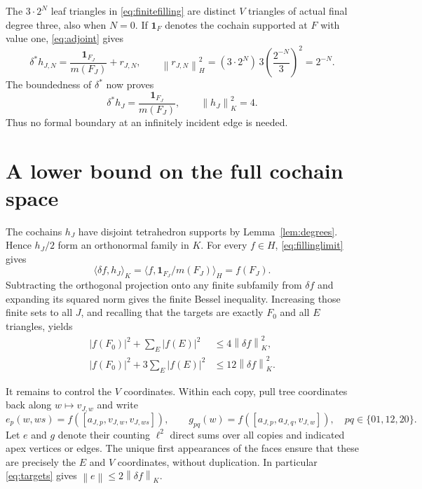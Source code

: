 \documentclass[11pt]{article}
\newcommand{\norm}[1]{\left\lVert#1\right\rVert}
\newcommand{\ip}[2]{\langle#1,#2\rangle}
\begin{document}
The $3\cdot2^N$ leaf triangles in \eqref{eq:finitefilling} are distinct $V$
triangles of actual final degree three, also when $N=0$. If $\mathbf1_F$
denotes the cochain supported at $F$ with value one, \eqref{eq:adjoint} gives
\[
 \delta^*h_{J,N}=\frac{\mathbf1_{F_J}}{m(F_J)}+r_{J,N},
 \qquad
 \norm{r_{J,N}}_H^2
   =(3\cdot2^N)\,3\left(\frac{2^{-N}}3\right)^2=2^{-N}.
\]
The boundedness of $\delta^*$ now proves
\begin{equation}\label{eq:fillinglimit}
 \delta^*h_J=\frac{\mathbf1_{F_J}}{m(F_J)},\qquad
 \norm{h_J}_K^2=4.
\end{equation}
Thus no formal boundary at an infinitely incident edge is needed.

\section{A lower bound on the full cochain space}\label{sec:estimate}

The cochains $h_J$ have disjoint tetrahedron supports by
Lemma~\ref{lem:degrees}. Hence $h_J/2$ form an orthonormal family in $K$.
For every $f\in H$, \eqref{eq:fillinglimit} gives
\[
 \ip{\delta f}{h_J}_K
   =\ip{f}{\mathbf1_{F_J}/m(F_J)}_H=f(F_J).
\]
Subtracting the orthogonal projection onto any finite subfamily from
$\delta f$ and expanding its squared norm gives the finite Bessel inequality.
Increasing those finite sets to all $J$, and recalling that the targets are
exactly $F_0$ and all $E$ triangles, yields
\begin{align}
 |f(F_0)|^2+\sum_E|f(E)|^2&\leq4\norm{\delta f}_K^2,
       \label{eq:targets}\\
 |f(F_0)|^2+3\sum_E|f(E)|^2&\leq12\norm{\delta f}_K^2.
       \label{eq:weightedtargets}
\end{align}

It remains to control the $V$ coordinates. Within each copy, pull tree
coordinates back along $w\mapsto v_{J,w}$ and write
\[
 e_p(w,ws)=f([a_{J,p},v_{J,w},v_{J,ws}]),\qquad
 g_{pq}(w)=f([a_{J,p},a_{J,q},v_{J,w}]),
 \quad pq\in\{01,12,20\}.
\]
Let $e$ and $g$ denote their counting $\ell^2$ direct sums over all copies
and indicated apex vertices or edges. The unique first appearances of the
faces ensure that these are precisely the $E$ and $V$ coordinates, without
duplication. In particular \eqref{eq:targets} gives
$\norm{e}\leq2\norm{\delta f}_K$.
\end{document}
